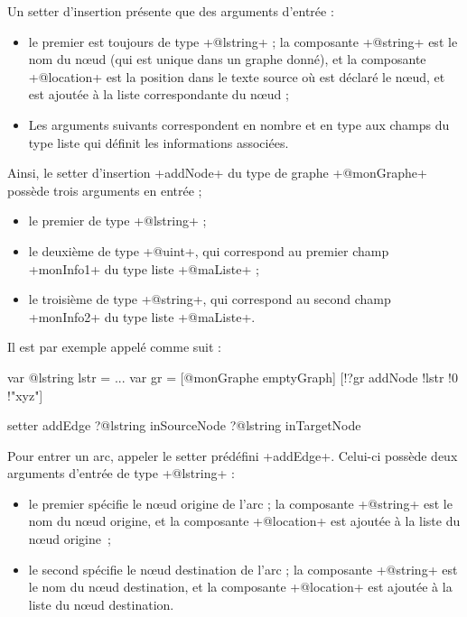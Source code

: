 Un setter d'insertion présente que des arguments d'entrée :
\begin{itemize}
  \item le premier est toujours de type \ggs+@lstring+ ; la composante \ggs+@string+ est le nom du nœud (qui est unique dans un graphe donné), et la composante \ggs+@location+ est la position dans le texte source où est déclaré le nœud, et est ajoutée à la liste correspondante du nœud ;
  \item Les arguments suivants correspondent en nombre et en type aux champs du type liste qui définit les informations associées.
\end{itemize}

Ainsi, le setter d'insertion \ggs+addNode+ du type de graphe \ggs+@monGraphe+ possède trois arguments en entrée ;
\begin{itemize}
  \item le premier de type \ggs+@lstring+ ;
  \item le deuxième de type \ggs+@uint+, qui correspond au premier champ \ggs+monInfo1+ du type liste \ggs+@maListe+ ;
  \item le troisième de type \ggs+@string+, qui correspond au second champ \ggs+monInfo2+ du type liste \ggs+@maListe+.
\end{itemize}

Il est par exemple appelé comme suit :
\begin{galgas}
var @lstring lstr = ... 
var gr = [@monGraphe emptyGraph] 
[!?gr addNode !lstr !0 !"xyz"] 
\end{galgas}





\begin{galgas}
setter addEdge ?@lstring inSourceNode ?@lstring inTargetNode 
\end{galgas}

Pour entrer un arc, appeler le setter prédéfini \ggs+addEdge+. Celui-ci possède deux arguments d'entrée de type \ggs+@lstring+ :
\begin{itemize}
  \item le premier spécifie le nœud origine de l'arc ; la composante \ggs+@string+ est le nom du nœud origine, et la composante \ggs+@location+ est ajoutée à la liste du nœud origine~;
  \item le second spécifie le nœud destination de l'arc ; la composante \ggs+@string+ est le nom du nœud destination, et la composante \ggs+@location+ est ajoutée à la liste du nœud destination.
\end{itemize}







